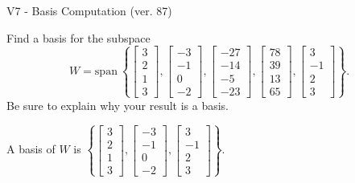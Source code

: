\begin{exercise}
  \begin{exerciseTitle}V7 - Basis Computation (ver. 87)\end{exerciseTitle}
  \begin{exerciseStatement}
    Find a basis for the subspace 
\[W=\mathrm{span}\ \left\{\left[\begin{array}{r}
3 \\
2 \\
1 \\
3
\end{array}\right] , \left[\begin{array}{r}
-3 \\
-1 \\
0 \\
-2
\end{array}\right] , \left[\begin{array}{r}
-27 \\
-14 \\
-5 \\
-23
\end{array}\right] , \left[\begin{array}{r}
78 \\
39 \\
13 \\
65
\end{array}\right] , \left[\begin{array}{r}
3 \\
-1 \\
2 \\
3
\end{array}\right]\right\}.\]
 Be sure to explain why your result is a basis.


  \end{exerciseStatement}
  \begin{exerciseAnswer}
   A basis of \(W\) is  \(\left\{\left[\begin{array}{r}
3 \\
2 \\
1 \\
3
\end{array}\right] , \left[\begin{array}{r}
-3 \\
-1 \\
0 \\
-2
\end{array}\right] , \left[\begin{array}{r}
3 \\
-1 \\
2 \\
3
\end{array}\right]\right\}\).
  


  \end{exerciseAnswer}
\end{exercise}